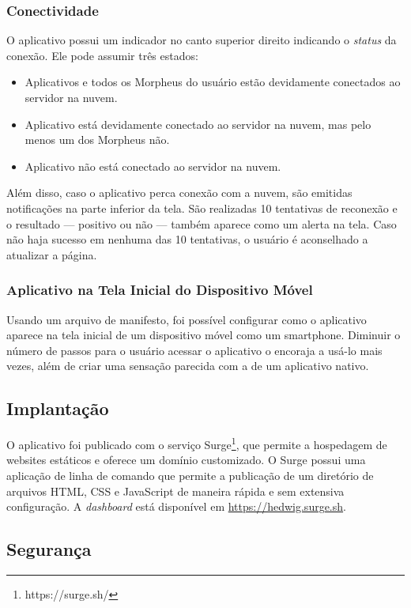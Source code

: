 \subsubsection{Conectividade}

O aplicativo possui um indicador no canto superior direito indicando o \textit{status} da conexão. Ele pode assumir três estados:

\begin{itemize}
\item Aplicativos e todos os Morpheus do usuário estão devidamente conectados ao servidor na nuvem.
\item Aplicativo está devidamente conectado ao servidor na nuvem, mas pelo menos um dos Morpheus não.
\item Aplicativo não está conectado ao servidor na nuvem.
\end{itemize}

Além disso, caso o aplicativo perca conexão com a nuvem, são emitidas notificações na parte inferior da tela. São realizadas 10 tentativas de reconexão e o resultado --- positivo ou não --- também aparece como um alerta na tela. Caso não haja sucesso em nenhuma das 10 tentativas, o usuário é aconselhado a atualizar a página.

\subsubsection{Aplicativo na Tela Inicial do Dispositivo Móvel}

Usando um arquivo de manifesto, foi possível configurar como o aplicativo aparece na tela inicial de um dispositivo móvel como um smartphone. Diminuir o número de passos para o usuário acessar o aplicativo o encoraja a usá-lo mais vezes, além de criar uma sensação parecida com a de um aplicativo nativo.

\subsection{Implantação}

O aplicativo foi publicado com o serviço Surge\footnote{https://surge.sh/}, que permite a hospedagem de websites estáticos e oferece um domínio customizado. O Surge possui uma aplicação de linha de comando que permite a publicação de um diretório de arquivos HTML, CSS e JavaScript de maneira rápida e sem extensiva configuração. A \textit{dashboard} está disponível em \url{https://hedwig.surge.sh}.

\subsection{Segurança}

